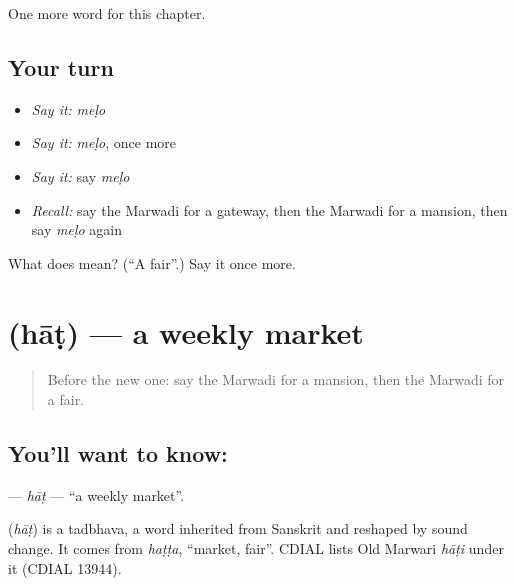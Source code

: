\begin{grammarlens}[title={What you've built}]
One more word for this chapter.
\end{grammarlens}

\subsection*{Your turn}
\begin{itemize}
\raggedright
  \item \emph{Say it:} \emph{meḷo}
  \item \emph{Say it:} \emph{meḷo}, once more
  \item \emph{Say it:} say \emph{meḷo}
  \item \emph{Recall:} say the Marwadi for a gateway, then the Marwadi for a mansion, then say \emph{meḷo} again
\end{itemize}

\begin{tcolorbox}[breakable,colback=teal!4,colframe=teal!35!black,title={Before you move on}]
What does  mean? (\textquotedblleft{}A fair\textquotedblright{}.) Say it once more.
\end{tcolorbox}
\section[\texorpdfstring{\mw{हाट} (hāṭ)}{हाट (hāṭ)}]{ (hāṭ) — a weekly market}

\label{lesson:MW-C100-hat}



\begin{quote}
Before the new one: say the Marwadi for a mansion, then the Marwadi for a fair.
\end{quote}

\subsection*{You'll want to know: }
\textbf{} — \emph{hāṭ} — \textquotedblleft{}a weekly market\textquotedblright{}.

\begin{cousinweb}
\textbf{} (\emph{hāṭ}) is a tadbhava, a word inherited from Sanskrit and reshaped by sound change. It comes from \emph{haṭṭa}, \textquotedblleft{}market, fair\textquotedblright{}. CDIAL lists Old Marwari \emph{hāṭi} under it (CDIAL 13944).
\end{cousinweb}

